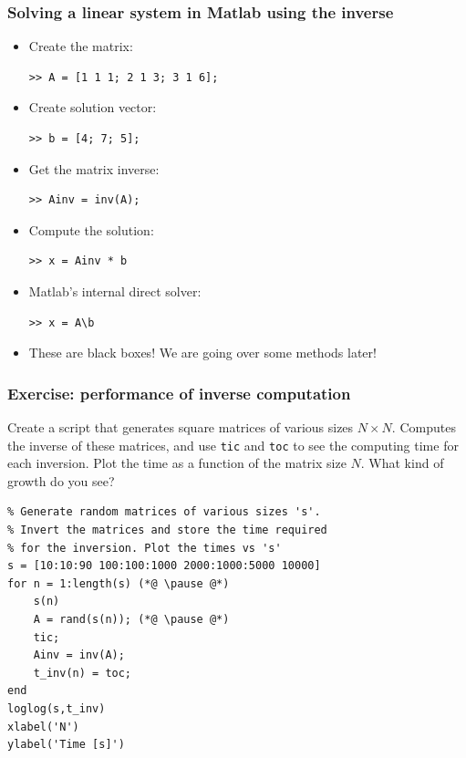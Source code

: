 \documentclass[11pt,table,final,xcolor={usenames,dvipsnames,table}]{beamer}
\begin{document}
\begin{frame}[fragile]
  \frametitle{Solving a linear system in Matlab using the inverse}
  \begin{itemize}
    \item Create the matrix:
    \begin{lstlisting}
>> A = [1 1 1; 2 1 3; 3 1 6];     
    \end{lstlisting}\pause
    \item Create solution vector:
    \begin{lstlisting}
>> b = [4; 7; 5]; 
    \end{lstlisting}\pause
    \item Get the matrix inverse:
    \begin{lstlisting}
>> Ainv = inv(A); 
    \end{lstlisting}\pause
    \item Compute the solution:
    \begin{lstlisting}
>> x = Ainv * b   
    \end{lstlisting}\pause
    \item Matlab's internal direct solver:
    \begin{lstlisting}
>> x = A\b
    \end{lstlisting}
    \item These are black boxes! We are going over some methods later!
  \end{itemize}
\end{frame}

\begin{frame}[fragile]
  \frametitle{Exercise: performance of inverse computation}
  Create a script that generates square matrices of various sizes $N\times N$. Computes the inverse of these matrices, and use \lstinline$tic$ and \lstinline$toc$ to see the computing time for each inversion. Plot the time as a function of the matrix size $N$. What kind of growth do you see? \pause
  \begin{lstlisting}
% Generate random matrices of various sizes 's'. 
% Invert the matrices and store the time required 
% for the inversion. Plot the times vs 's'
s = [10:10:90 100:100:1000 2000:1000:5000 10000]
for n = 1:length(s) (*@ \pause @*)
    s(n)
    A = rand(s(n)); (*@ \pause @*)
    tic;
    Ainv = inv(A);
    t_inv(n) = toc;
end
loglog(s,t_inv)
xlabel('N')
ylabel('Time [s]')
  \end{lstlisting}
\end{frame}
\end{document}
